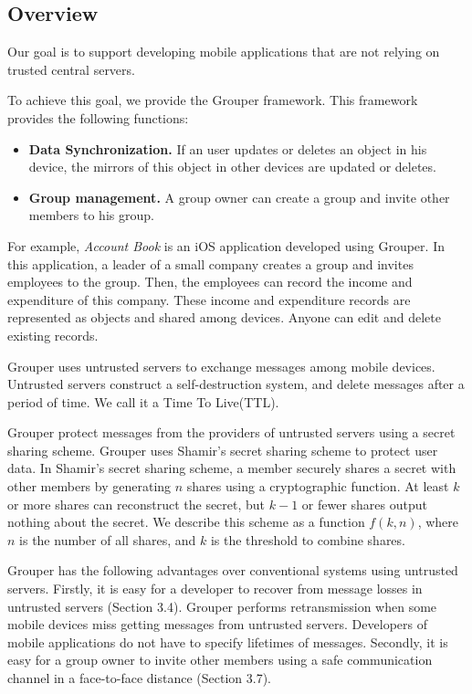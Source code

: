 \documentclass[twocolumn,10pt]{article}
\begin{document}
\subsection{Overview}

Our goal is to support developing mobile applications that are not relying on trusted central servers.

To achieve this goal, we provide the Grouper framework.
This framework provides the following functions:

\begin{itemize}
	\setlength{\itemsep}{1pt}
	\setlength{\parskip}{0pt}
	\setlength{\parsep}{0pt}
	\item \textbf{Data Synchronization.} 
	If an user updates or deletes an object in his device, the mirrors of this object in other devices are updated or deletes.
	\item \textbf{Group management.} 
	A group owner can create a group and invite other members to his group.
\end{itemize}

For example, \emph{Account Book} is an iOS application developed using Grouper. 
In this application, a leader of a small company creates a group and invites employees to the group. 
Then, the employees can record the income and expenditure of this company.
These income and expenditure records are represented as objects and shared among devices.
Anyone can edit and delete existing records.

Grouper uses untrusted servers to exchange messages among mobile devices.
Untrusted servers construct a self-destruction system, and delete messages after a period of time.
We call it a Time To Live(TTL).

Grouper protect messages from the providers of untrusted servers using a secret sharing scheme.
Grouper uses Shamir's secret sharing scheme to protect user data.
In  Shamir's secret sharing scheme, a member securely shares a secret with other members by generating $n$ shares using a cryptographic function\cite{smith2013layered}. 
At least $k$ or more shares can reconstruct the secret, but $k-1$ or fewer shares output nothing about the secret\cite{pang2005new}. 
We describe this scheme as a function ${f(k, n)}$, where $n$ is the number of all shares, and $k$ is the threshold to combine shares. 

Grouper has the following advantages over conventional systems using untrusted servers.
Firstly, it is easy for a developer to recover from message losses in untrusted servers (Section 3.4).
Grouper performs retransmission when some mobile devices miss getting messages from untrusted servers.
Developers of mobile applications do not have to specify lifetimes of messages.
Secondly, it is easy for a group owner to invite other members using a safe communication channel in a face-to-face distance (Section 3.7).
\end{document}
